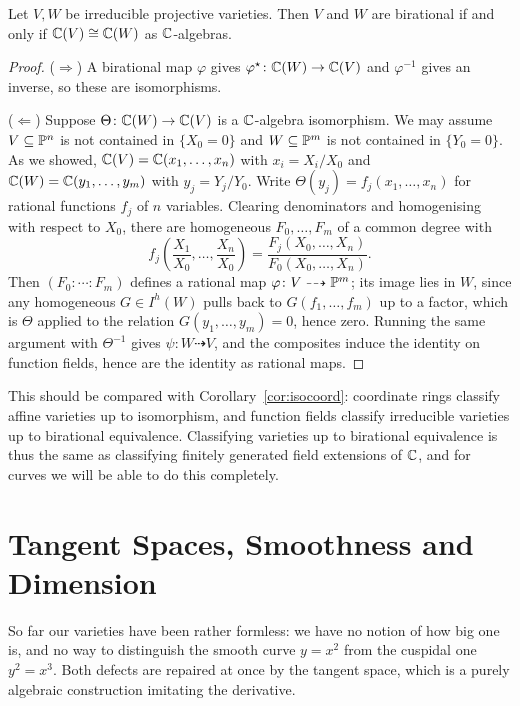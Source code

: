 \documentclass[a4paper]{scrartcl}
\newcommand{\dto}{\dashrightarrow}
\begin{document}
\begin{theorem}\label{thm:biratfield}
	Let $V, W$ be irreducible projective varieties. Then $V$ and $W$ are birational if and only if $\mathbb{C}(V) \cong \mathbb{C}(W)$ as $\mathbb{C}$-algebras.
\end{theorem}

\begin{proof}
	($\Rightarrow$) A birational map $\varphi$ gives $\varphi^\star \colon \mathbb{C}(W) \to \mathbb{C}(V)$ and $\varphi^{-1}$ gives an inverse, so these are isomorphisms.

	($\Leftarrow$) Suppose $\Theta \colon \mathbb{C}(W) \to \mathbb{C}(V)$ is a $\mathbb{C}$-algebra isomorphism. We may assume $V \subseteq \mathbb{P}^n$ is not contained in $\{X_0 = 0\}$ and $W\subseteq\mathbb{P}^m$ is not contained in $\{Y_0=0\}$. As we showed, $\mathbb{C}(V) = \mathbb{C}(x_1,\dots,x_n)$ with $x_i = X_i/X_0$ and $\mathbb{C}(W) = \mathbb{C}(y_1,\dots,y_m)$ with $y_j = Y_j/Y_0$. Write $\Theta(y_j) = f_j(x_1,\dots,x_n)$ for rational functions $f_j$ of $n$ variables. Clearing denominators and homogenising with respect to $X_0$, there are homogeneous $F_0,\dots,F_m$ of a common degree with
	$$f_j\left(\frac{X_1}{X_0},\dots,\frac{X_n}{X_0}\right) = \frac{F_j(X_0,\dots,X_n)}{F_0(X_0,\dots,X_n)}.$$
	Then $(F_0:\cdots:F_m)$ defines a rational map $\varphi \colon V \dto \PP^m$; its image lies in $W$, since any homogeneous $G \in I^h(W)$ pulls back to $G(f_1,\dots,f_m)$ up to a factor, which is $\Theta$ applied to the relation $G(y_1,\dots,y_m) = 0$, hence zero. Running the same argument with $\Theta^{-1}$ gives $\psi \colon W \dto V$, and the composites induce the identity on function fields, hence are the identity as rational maps.
\end{proof}

This should be compared with Corollary~\ref{cor:isocoord}: coordinate rings classify affine varieties up to isomorphism, and function fields classify irreducible varieties up to birational equivalence. Classifying varieties up to birational equivalence is thus the same as classifying finitely generated field extensions of $\mathbb{C}$, and for curves we will be able to do this completely.

\section{Tangent Spaces, Smoothness and Dimension}\label{sec:tangent}

So far our varieties have been rather formless: we have no notion of how big one is, and no way to distinguish the smooth curve $y = x^2$ from the cuspidal one $y^2 = x^3$. Both defects are repaired at once by the tangent space, which is a purely algebraic construction imitating the derivative.
\end{document}
